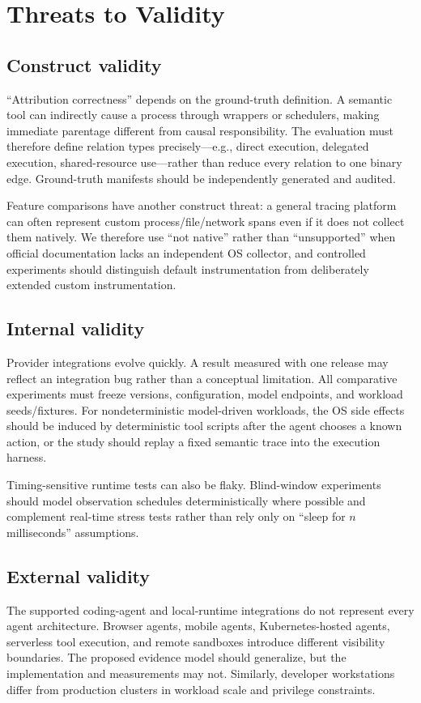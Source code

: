 \section{Threats to Validity}
\subsection{Construct validity}
``Attribution correctness'' depends on the ground-truth definition. A semantic tool can indirectly cause a process through wrappers or schedulers, making immediate parentage different from causal responsibility. The evaluation must therefore define relation types precisely---e.g., direct execution, delegated execution, shared-resource use---rather than reduce every relation to one binary edge. Ground-truth manifests should be independently generated and audited.

Feature comparisons have another construct threat: a general tracing platform can often represent custom process/file/network spans even if it does not collect them natively. We therefore use ``not native'' rather than ``unsupported'' when official documentation lacks an independent OS collector, and controlled experiments should distinguish default instrumentation from deliberately extended custom instrumentation.

\subsection{Internal validity}
Provider integrations evolve quickly. A result measured with one release may reflect an integration bug rather than a conceptual limitation. All comparative experiments must freeze versions, configuration, model endpoints, and workload seeds/fixtures. For nondeterministic model-driven workloads, the OS side effects should be induced by deterministic tool scripts after the agent chooses a known action, or the study should replay a fixed semantic trace into the execution harness.

Timing-sensitive runtime tests can also be flaky. Blind-window experiments should model observation schedules deterministically where possible and complement real-time stress tests rather than rely only on ``sleep for $n$ milliseconds'' assumptions.

\subsection{External validity}
The supported coding-agent and local-runtime integrations do not represent every agent architecture. Browser agents, mobile agents, Kubernetes-hosted agents, serverless tool execution, and remote sandboxes introduce different visibility boundaries. The proposed evidence model should generalize, but the implementation and measurements may not. Similarly, developer workstations differ from production clusters in workload scale and privilege constraints.

